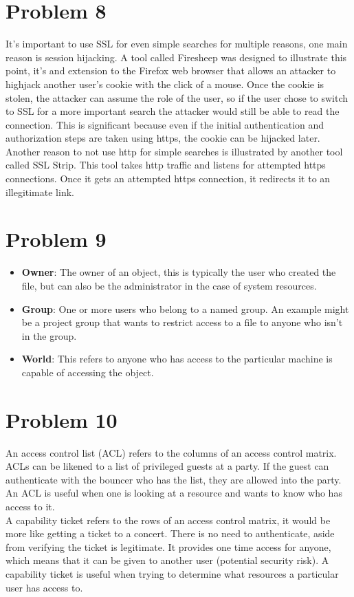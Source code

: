 \documentclass{article}
\begin{document}
\section*{Problem 8}
It's important to use SSL for even simple searches for multiple reasons, one main reason is session hijacking. A tool called Firesheep was designed to illustrate this point, it's and extension to the Firefox web browser that allows an attacker to highjack another user's cookie with the click of a mouse. Once the cookie is stolen, the attacker can assume the role of the user, so if the user chose to switch to SSL for a more important search the attacker would still be able to read the connection. This is significant because even if the initial authentication and authorization steps are taken using https, the cookie can be hijacked later. Another reason to not use http for simple searches is illustrated by another tool called SSL Strip. This tool takes http traffic and listens for attempted https connections. Once it gets an attempted https connection, it redirects it to an illegitimate link.\\

\section*{Problem 9}
\begin{itemize}
    \item \textbf{Owner}: The owner of an object, this is typically the user who created the file, but can also be the administrator in  the case of system resources.\\
    \item \textbf{Group}: One or more users who belong to a named group. An example might be a project group that wants to restrict access to a file to anyone who isn't in the group.\\
    \item \textbf{World}: This refers to anyone who has access to the particular machine is capable of accessing the object. \\
\end{itemize}


\section*{Problem 10}
An access control list (ACL) refers to the columns of an access control matrix. ACLs can be likened to a list of privileged guests at a party. If the guest can authenticate with the bouncer who has the list, they are allowed into the party. An ACL is useful when one is looking at a resource and wants to know who has access to it.\\
A capability ticket refers to the rows of an access control matrix, it would be more like getting a ticket to a concert. There is no need to authenticate, aside from verifying the ticket is legitimate. It provides one time access for anyone, which means that it can be given to another user (potential security risk). A capability ticket is useful when trying to determine what resources a particular user has access to.\\
\end{document}
